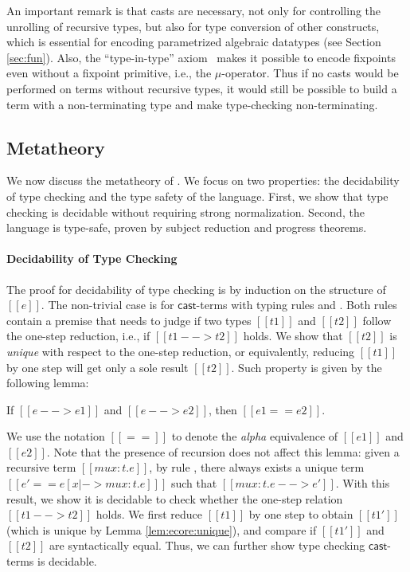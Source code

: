 An important remark is that casts are necessary, not only for controlling the unrolling of recursive types,
but also for type conversion of other constructs, which is essential
for encoding parametrized algebraic datatypes (see Section \ref{sec:fun}).
Also, the ``type-in-type'' axiom~\cite{typeintype} makes it possible
to encode fixpoints even without a fixpoint primitive, i.e., the $\mu$-operator.
Thus if no casts would be performed on terms without recursive types,
it would still be possible to build a term with a non-terminating type and
make type-checking non-terminating.

\subsection{Metatheory}\label{sec:ecore:meta}
We now discuss the metatheory of \ecore. We focus on two properties:
the decidability of type checking and the type safety of the
language. First, we show that type checking \ecore is decidable
without requiring strong normalization. Second, the language is type-safe, 
proven by subject reduction and progress theorems.

\paragraph{Decidability of Type Checking}
The proof for decidability of type checking is by induction on the
structure of $[[e]]$. The non-trivial case
is for $\mathsf{cast}$-terms with typing rules  and
. Both rules contain a premise that needs to judge if
two types $[[t1]]$ and $[[t2]]$ follow the one-step reduction, i.e.,
if $[[t1 --> t2]]$ holds. We show that $[[t2]]$ is
\emph{unique} with respect to the one-step reduction, or equivalently,
reducing $[[t1]]$ by one step will get only a sole result
$[[t2]]$. Such property is given by the following lemma:

\begin{lemma}\label{lem:ecore:unique}
	If $[[e --> e1]]$ and $[[e --> e2]]$, then $[[e1 == e2]]$.
\end{lemma}

We use the notation $[[==]]$ to denote the \emph{alpha}
equivalence of $[[e1]]$ and $[[e2]]$.
Note that the presence of recursion does not affect this lemma: 
given a recursive term
$[[mu x:t.e]]$, by rule , there always exists a unique
term $[[e'==e[x|->mu x:t.e] ]]$ such that $[[mu x:t.e -->
    e']]$.
With this result, we show it is decidable to check whether
the one-step relation $[[t1 --> t2]]$ holds. We first
reduce $[[t1]]$ by one step to obtain $[[t1']]$ (which is
unique by Lemma \ref{lem:ecore:unique}), and compare if $[[t1']]$ and
$[[t2]]$ are syntactically equal. Thus, we can further show type
checking $\mathsf{cast}$-terms is decidable.

